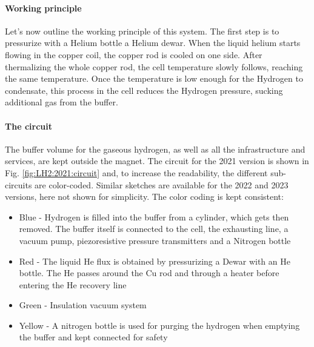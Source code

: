 \begin{refsection}
    \paragraph{Working principle}
    Let's now outline the working principle of this system.
    The first step is to pressurize with a Helium bottle a Helium dewar.
    When the liquid helium starts flowing in the copper coil, the copper rod is cooled on one side.
    After thermalizing the whole copper rod, the cell temperature slowly follows, reaching the same temperature.
    Once the temperature is low enough for the Hydrogen to condensate, this process in the cell reduces the Hydrogen pressure, sucking additional gas from the buffer.

    \paragraph{The circuit}
    The buffer volume for the gaseous hydrogen, as well as all the infrastructure and services, are kept outside the magnet. The circuit for the 2021 version is shown in Fig. \ref{fig:LH2:2021:circuit} and, to increase the readability, the different sub-circuits are color-coded. 
    Similar sketches are available for the 2022 and 2023 versions, here not shown for simplicity.
    The color coding is kept consistent:
    \begin{itemize}
        \item Blue - Hydrogen is filled into the buffer from a cylinder, which gets then removed.
        The buffer itself is connected to the cell, the exhausting line, a vacuum pump, piezoresistive pressure transmitters and a Nitrogen bottle
        \item Red - The liquid He flux is obtained by pressurizing a Dewar with an He bottle. 
        The He passes around the Cu rod and through a heater before entering the He recovery line
        \item Green - Insulation vacuum system
        \item Yellow - A nitrogen bottle is used for purging the hydrogen when emptying the buffer and kept connected for safety
    \end{itemize}
    


\end{refsection}
